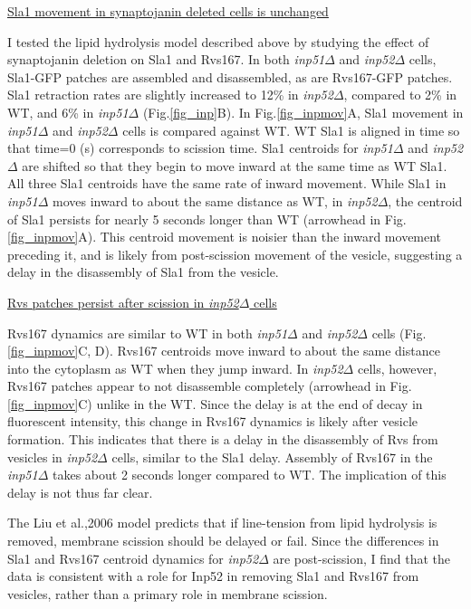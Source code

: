 	

\underline{Sla1 movement in synaptojanin deleted cells is unchanged}

I tested the lipid hydrolysis model described above by studying the effect of synaptojanin deletion on Sla1 and Rvs167. 
In both \textit{inp51$\Delta$} and \textit{inp52$\Delta$} cells, Sla1-GFP patches are assembled and disassembled, as are Rvs167-GFP patches. Sla1 retraction rates are slightly increased to 12\% in \textit{inp52$\Delta$}, compared to 2\% in WT, and 6\% in \textit{inp51$\Delta$}
(Fig.\ref{fig_inp}B).  In Fig.\ref{fig_inpmov}A, Sla1 movement in \textit{inp51$\Delta$} and \textit{inp52$\Delta$}
 cells is compared against WT. WT Sla1 is aligned in time so that time=0 (s) corresponds to scission time. Sla1 centroids for \textit{inp51$\Delta$} and \textit{inp52$\Delta$} are shifted so that they begin to move inward at the same time as WT Sla1. All three Sla1 centroids have the same rate of inward movement. While Sla1 in \textit{inp51$\Delta$} moves inward to about the same distance as WT, in \textit{inp52$\Delta$}, the centroid of Sla1 persists for nearly 5 seconds longer than WT (arrowhead in Fig.\ref{fig_inpmov}A). This centroid movement is noisier than the inward movement preceding it, and is likely from post-scission movement of the vesicle, suggesting a delay in the disassembly of Sla1 from the vesicle. 


\vspace{5mm}	
\underline{Rvs patches persist after scission in \textit{inp52$\Delta$} cells }

Rvs167 dynamics are similar to WT in both \textit{inp51$\Delta$}
 and \textit{inp52$\Delta$} cells (Fig.\ref{fig_inpmov}C, D). Rvs167 centroids move inward to about the same distance into the cytoplasm as WT when they jump inward. In \textit{inp52$\Delta$} cells, however, Rvs167 patches appear to not disassemble completely (arrowhead in Fig.\ref{fig_inpmov}C) unlike in the WT. Since  the delay is at the end of decay in fluorescent intensity, this change in Rvs167 dynamics is likely after vesicle formation. This indicates that there is a delay in the disassembly of Rvs from vesicles in \textit{inp52$\Delta$} cells, similar to the Sla1 delay. Assembly of Rvs167 in the \textit{inp51$\Delta$}
 takes about 2 seconds longer compared to WT. The implication of this delay is not thus far clear. 

	\vspace{5mm}
The Liu et al.,2006 model predicts that if line-tension from lipid hydrolysis is removed, membrane scission should be delayed or fail. Since the differences in Sla1 and Rvs167 centroid dynamics for \textit{inp52$\Delta$} are post-scission, I find that the data is consistent with a role for Inp52 in removing Sla1 and Rvs167 from vesicles, rather than a primary role in membrane scission. 

